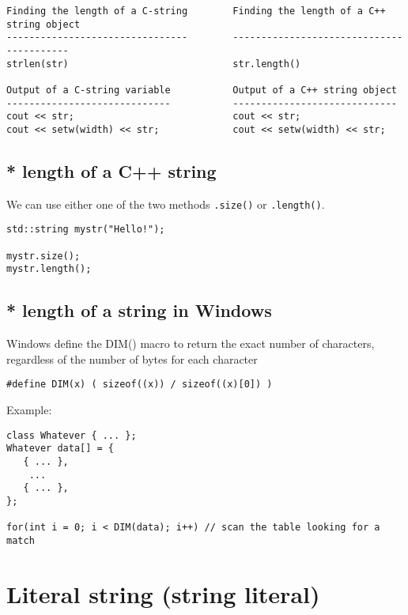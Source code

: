 \begin{verbatim}
Finding the length of a C-string        Finding the length of a C++ string object
--------------------------------        -----------------------------------------
strlen(str)                             str.length()

Output of a C-string variable           Output of a C++ string object
-----------------------------           -----------------------------
cout << str;                            cout << str;
cout << setw(width) << str;             cout << setw(width) << str;
\end{verbatim}

\subsection{* length of a C++ string}

We can use either one of the two methods \verb!.size()! or \verb!.length()!.

\begin{verbatim}
std::string mystr("Hello!");

mystr.size(); 
mystr.length();
\end{verbatim}

\subsection{* length of a string in Windows}

Windows define the DIM() macro to return the exact number of characters,
regardless of the number of bytes for each character
\begin{verbatim}
#define DIM(x) ( sizeof((x)) / sizeof((x)[0]) )
\end{verbatim}

Example:
\begin{verbatim}
class Whatever { ... };
Whatever data[] = {
   { ... },
    ...
   { ... },
};

for(int i = 0; i < DIM(data); i++) // scan the table looking for a match 

\end{verbatim}

\section{Literal string (string literal)}
\label{sec:string_literal}
\label{sec:literal-string}


